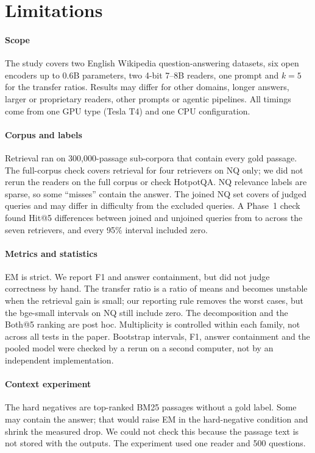 \section{Limitations}\label{sec:limits}

\paragraph{Scope}
The study covers two English Wikipedia question-answering datasets, six open encoders up to 0.6B parameters, two 4-bit 7--8B readers, one prompt and $k=5$ for the transfer ratios. Results may differ for other domains, longer answers, larger or proprietary readers, other prompts or agentic pipelines. All timings come from one GPU type (Tesla T4) and one CPU configuration.

\paragraph{Corpus and labels}
Retrieval ran on 300,000-passage sub-corpora that contain every gold passage. The full-corpus check covers retrieval for four retrievers on NQ only; we did not rerun the readers on the full corpus or check HotpotQA. NQ relevance labels are sparse, so some ``misses'' contain the answer. The joined NQ set covers  of  judged queries and may differ in difficulty from the excluded queries. A Phase~1 check found Hit@5 differences between joined and unjoined queries from  to  across the seven retrievers, and every 95\% interval included zero.

\paragraph{Metrics and statistics}
EM is strict. We report F1 and answer containment, but did not judge correctness by hand. The transfer ratio is a ratio of means and becomes unstable when the retrieval gain is small; our reporting rule removes the worst cases, but the bge-small intervals on NQ still include zero. The decomposition and the Both@5 ranking are post hoc. Multiplicity is controlled within each family, not across all tests in the paper. Bootstrap intervals, F1, answer containment and the pooled model were checked by a rerun on a second computer, not by an independent implementation.

\paragraph{Context experiment}
The hard negatives are top-ranked BM25 passages without a gold label. Some may contain the answer; that would raise EM in the hard-negative condition and shrink the measured drop. We could not check this because the passage text is not stored with the outputs. The experiment used one reader and 500 questions.

